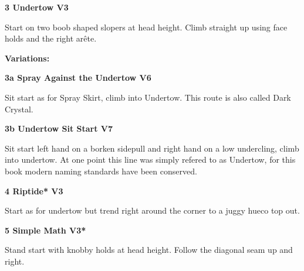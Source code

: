 \begin{multicols}{2}
\needspace{1.5cm}
\label{rt:Undertow}
\colorbox{green!20}{
\parbox{0.95\linewidth}{
\textbf{
3 Undertow V3  
}}}

\begin{adjustwidth}{0.5cm}{}			
Start on two boob shaped slopers at head height. Climb straight up using face holds and the right arête.
\end{adjustwidth}

\begin{adjustwidth}{0.5cm}{}				
\needspace{3cm}
\textbf{Variations:} \newline

\needspace{1.5cm}
\label{vr:Spray Against the Undertow}
\colorbox{RoyalBlue!20}{
\parbox{0.95\linewidth}{
\textbf{
3a Spray Against the Undertow V6  
}}}

\begin{adjustwidth}{0.5cm}{}			
Sit start as for Spray Skirt, climb into Undertow. This route is also called Dark Crystal.
\end{adjustwidth}



\needspace{1.5cm}
\label{vr:Undertow Sit Start}
\colorbox{Goldenrod!50}{
\parbox{0.95\linewidth}{
\textbf{
3b Undertow Sit Start V7  
}}}

\begin{adjustwidth}{0.5cm}{}			
Sit start left hand on a borken sidepull and right hand on a low undercling, climb into undertow. At one point this line was simply refered to as Undertow, for this book modern naming standards have been conserved.
\end{adjustwidth}


\end{adjustwidth}


\needspace{1.5cm}
\label{rt:Riptide}
\colorbox{green!20}{
\parbox{0.95\linewidth}{
\textbf{
4 Riptide* V3  
}}}

\begin{adjustwidth}{0.5cm}{}			
Start as for undertow but trend right around the corner to a juggy hueco top out.
\end{adjustwidth}



\needspace{1.5cm}
\label{rt:Simple Math}
\colorbox{green!20}{
\parbox{0.95\linewidth}{
\textbf{
5 Simple Math V3*  
}}}

\begin{adjustwidth}{0.5cm}{}			
Stand start with knobby holds at head height. Follow the diagonal seam up and right.
\end{adjustwidth}


\end{multicols}
